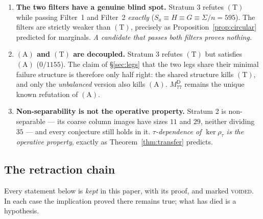 \documentclass[11pt]{article}
\theoremstyle{plain}
\theoremstyle{definition}
\theoremstyle{remark}
\numberwithin{equation}{section}
\begin{document}
\begin{enumerate}
\item[(i)] \textbf{The two filters have a genuine blind spot.} Stratum 3 refutes
$(\mathrm{T})$ while passing Filter~1 and Filter~2 \emph{exactly}
($S_a\equiv H\equiv G\equiv\Sigma/n = 595$). The filters are strictly weaker than
$(\mathrm{T})$, precisely as Proposition~\ref{prop:circular} predicted for
marginals. \emph{A candidate that passes both filters proves nothing.}
\item[(ii)] \textbf{$(\mathrm{A})$ and $(\mathrm{T})$ are decoupled.} Stratum 3
refutes $(\mathrm{T})$ but satisfies $(\mathrm{A})$ ($0/1155$). The claim of
\S\ref{sec:legs} that the two legs share their minimal failure structure is
therefore only half right: the shared structure kills $(\mathrm{T})$, and only the
\emph{unbalanced} version also kills $(\mathrm{A})$. $M_{77}^{\mathrm{D}}$ remains
the unique known refutation of $(\mathrm{A})$.
\item[(iii)] \textbf{Non-separability is not the operative property.} Stratum 2 is
non-separable --- its coarse column images have sizes $11$ and $29$, neither
dividing $35$ --- and every conjecture still holds in it.
\emph{$\tau$-dependence of $\ker\rho_\tau$ is the operative property}, exactly as
Theorem~\ref{thm:transfer} predicts.
\end{enumerate}

\subsection{The retraction chain}\label{sec:retraction}

Every statement below is \emph{kept} in this paper, with its proof, and marked
\textsc{voided}. In each case the implication proved there remains true; what has
died is a hypothesis.
\end{document}
